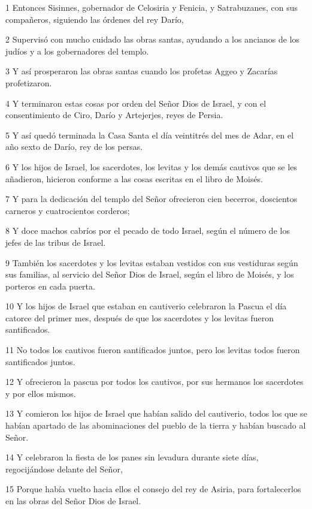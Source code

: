 \par 1 Entonces Sisinnes, gobernador de Celosiria y Fenicia, y Satrabuzanes, con sus compañeros, siguiendo las órdenes del rey Darío,
\par 2 Supervisó con mucho cuidado las obras santas, ayudando a los ancianos de los judíos y a los gobernadores del templo.
\par 3 Y así prosperaron las obras santas cuando los profetas Aggeo y Zacarías profetizaron.
\par 4 Y terminaron estas cosas por orden del Señor Dios de Israel, y con el consentimiento de Ciro, Darío y Artejerjes, reyes de Persia.
\par 5 Y así quedó terminada la Casa Santa el día veintitrés del mes de Adar, en el año sexto de Darío, rey de los persas.
\par 6 Y los hijos de Israel, los sacerdotes, los levitas y los demás cautivos que se les añadieron, hicieron conforme a las cosas escritas en el libro de Moisés.
\par 7 Y para la dedicación del templo del Señor ofrecieron cien becerros, doscientos carneros y cuatrocientos corderos;
\par 8 Y doce machos cabríos por el pecado de todo Israel, según el número de los jefes de las tribus de Israel.
\par 9 También los sacerdotes y los levitas estaban vestidos con sus vestiduras según sus familias, al servicio del Señor Dios de Israel, según el libro de Moisés, y los porteros en cada puerta.
\par 10 Y los hijos de Israel que estaban en cautiverio celebraron la Pascua el día catorce del primer mes, después de que los sacerdotes y los levitas fueron santificados.
\par 11 No todos los cautivos fueron santificados juntos, pero los levitas todos fueron santificados juntos.
\par 12 Y ofrecieron la pascua por todos los cautivos, por sus hermanos los sacerdotes y por ellos mismos.
\par 13 Y comieron los hijos de Israel que habían salido del cautiverio, todos los que se habían apartado de las abominaciones del pueblo de la tierra y habían buscado al Señor.
\par 14 Y celebraron la fiesta de los panes sin levadura durante siete días, regocijándose delante del Señor,
\par 15 Porque había vuelto hacia ellos el consejo del rey de Asiria, para fortalecerlos en las obras del Señor Dios de Israel.

